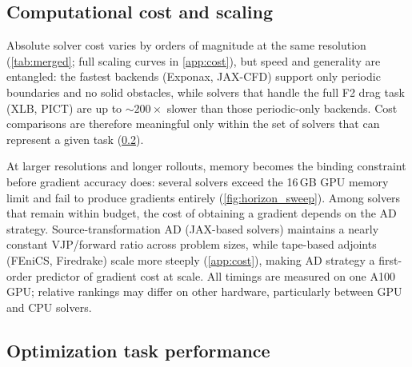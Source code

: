 \documentclass{article}
\begin{document}
\subsection{Computational cost and scaling}
\label{sec:scaling}

Absolute solver cost varies by orders of magnitude at the same
resolution (\cref{tab:merged}; full scaling curves in \cref{app:cost}),
but speed and generality are entangled: the fastest backends
(Exponax, JAX-CFD) support only periodic boundaries and no solid
obstacles, while solvers that handle the full F2 drag task (XLB, PICT)
are up to ${\sim}200\times$ slower than those periodic-only backends. Cost comparisons are therefore meaningful only
within the set of solvers that can represent a given task (\cref{sec:optimization}).

At larger resolutions and longer rollouts, memory becomes the binding
constraint before gradient accuracy does: several solvers exceed the
16\,GB GPU memory limit and fail to produce gradients entirely
(\cref{fig:horizon_sweep}).
Among solvers that remain within budget, the cost of obtaining a
gradient depends on the AD strategy.
Source-transformation AD (JAX-based solvers) maintains a nearly constant
VJP/forward ratio across problem sizes, while tape-based adjoints
(FEniCS, Firedrake) scale more steeply (\cref{app:cost}), making AD
strategy a first-order predictor of gradient cost at scale.
All timings are measured on one A100 GPU;
relative rankings may differ on other hardware, particularly between
GPU and CPU solvers.

\subsection{Optimization task performance}
\label{sec:optimization}
\end{document}
